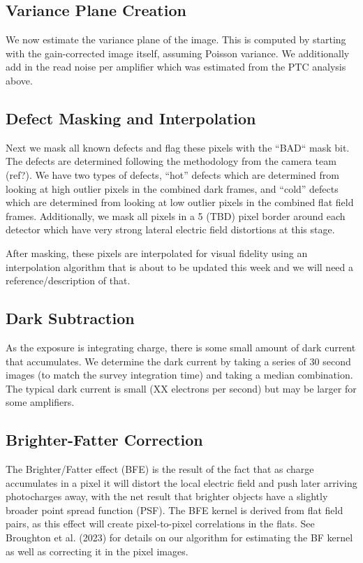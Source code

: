 \documentclass[SE,authoryear,lsstdraft,toc]{lsstdoc}
\begin{document}
\subsection{Variance Plane Creation}

We now estimate the variance plane of the image.  This is computed by starting
with the gain-corrected image itself, assuming Poisson variance.  We
additionally add in the read noise per amplifier which was estimated from the
PTC analysis above.

\subsection{Defect Masking and Interpolation}

Next we mask all known defects and flag these pixels with the ``BAD`` mask bit.
The defects are determined following the methodology from the camera team
(ref?).  We have two types of defects, ``hot'' defects which are determined
from looking at high outlier pixels in the combined dark frames, and ``cold''
defects which are determined from looking at low outlier pixels in the combined
flat field frames.  Additionally, we mask all pixels in a 5 (TBD) pixel border
around each detector which have very strong lateral electric field distortions
at this stage.

After masking, these pixels are interpolated for visual fidelity using an
interpolation algorithm that is about to be updated this week and we will need
a reference/description of that.

\subsection{Dark Subtraction}

As the exposure is integrating charge, there is some small amount of dark
current that accumulates.  We determine the dark current by taking a series of
30 second images (to match the survey integration time) and taking a median
combination.  The typical dark current is small (XX electrons per second) but
may be larger for some amplifiers.

\subsection{Brighter-Fatter Correction}

The Brighter/Fatter effect (BFE) is the result of the fact that as charge
accumulates in a pixel it will distort the local electric field and push later
arriving photocharges away, with the net result that brighter objects have a
slightly broader point spread function (PSF).  The BFE kernel is derived from
flat field pairs, as this effect will create pixel-to-pixel correlations in the
flats.  See Broughton et al. (2023) for details on our algorithm for estimating the BF
kernel as well as correcting it in the pixel images.
\end{document}
